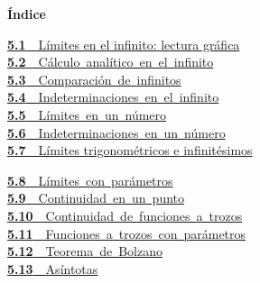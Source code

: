 \documentclass[11pt,a4paper]{article}
\begin{document}
\begin{tcolorbox}[colback=fmsurface,colframe=fmsurface,arc=3mm,left=4mm,right=4mm,top=2mm,bottom=2mm]
\small\textbf{Índice}\par\smallskip
\begin{minipage}[t]{0.49\linewidth}\small \hyperlink{sec1}{\textbf{\color{fmgreen}5.1}\ \ Límites en el infinito: lectura gráfica}\\[3pt]
\mbox{\hyperlink{sec2}{\textbf{\color{fmgreen}5.2}\ \ Cálculo analítico en el infinito}}\\[3pt]
\mbox{\hyperlink{sec3}{\textbf{\color{fmgreen}5.3}\ \ Comparación de infinitos}}\\[3pt]
\mbox{\hyperlink{sec4}{\textbf{\color{fmgreen}5.4}\ \ Indeterminaciones en el infinito}}\\[3pt]
\mbox{\hyperlink{sec5}{\textbf{\color{fmgreen}5.5}\ \ Límites en un número}}\\[3pt]
\mbox{\hyperlink{sec6}{\textbf{\color{fmgreen}5.6}\ \ Indeterminaciones en un número}}\\[3pt]
\hyperlink{sec7}{\textbf{\color{fmgreen}5.7}\ \ Límites trigonométricos e infinitésimos}\\[3pt]\end{minipage}\hfill\begin{minipage}[t]{0.49\linewidth}\small \mbox{\hyperlink{sec8}{\textbf{\color{fmgreen}5.8}\ \ Límites con parámetros}}\\[3pt]
\mbox{\hyperlink{sec9}{\textbf{\color{fmgreen}5.9}\ \ Continuidad en un punto}}\\[3pt]
\mbox{\hyperlink{sec10}{\textbf{\color{fmgreen}5.10}\ \ Continuidad de funciones a trozos}}\\[3pt]
\mbox{\hyperlink{sec11}{\textbf{\color{fmgreen}5.11}\ \ Funciones a trozos con parámetros}}\\[3pt]
\mbox{\hyperlink{sec12}{\textbf{\color{fmgreen}5.12}\ \ Teorema de Bolzano}}\\[3pt]
\mbox{\hyperlink{sec13}{\textbf{\color{fmgreen}5.13}\ \ Asíntotas}}\\[3pt]\end{minipage}
\end{tcolorbox}

\end{document}
